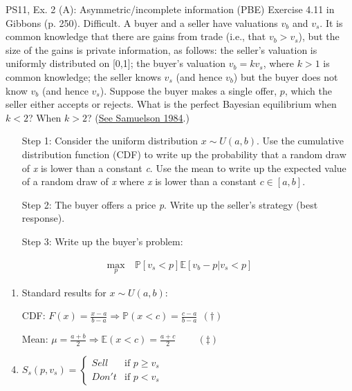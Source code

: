 \begin{frame}{PS11, Ex. 2 (A): Asymmetric/incomplete information (PBE)}
    Exercise 4.11 in Gibbons (p. 250). Difficult. A buyer and a seller have valuations $v_b$ and $v_s$. It is common knowledge that there are gains from trade (i.e., that $v_b > v_s$), but the size of the gains is private information, as follows: the seller’s valuation is uniformly distributed on [0,1]; the buyer’s valuation $v_b = kv_s$, where $k > 1$ is common knowledge; the seller knows $v_s$ (and hence $v_b$) but the buyer does not know $v_b$ (and hence $v_s$). Suppose the buyer makes a single offer, $p$, which the seller either accepts or rejects. What is the perfect Bayesian equilibrium when $k < 2$? When $k > 2$? (\href{https://www.jstor.org/stable/1911195}{See Samuelson 1984}.) \vspace{-8pt}
    \begin{multicols}{2}
      \begin{itemize}
        \item[Step 1:] Consider the uniform distribution $x\sim U(a, b)$. Use the cumulative distribution function (CDF) to write up the probability that a random draw of \textit{x} is lower than a constant \textit{c}. Use the mean to write up the expected value of a random draw of \textit{x} where \textit{x} is lower than a constant $c\in[a,b]$.
        \item[Step 2:] The buyer offers a price \textit{p}. Write up the seller's strategy (best response).
        \item[Step 3:] Write up the buyer's problem:
      \end{itemize} \vspace{-8pt}
      \begin{align*}
        \displaystyle{\max_p}&\ \mathbb{P}[v_s<p]\mathbb{E}[v_b-p|v_s<p]
      \end{align*}
      \vfill\null\columnbreak
      \begin{enumerate}
        \item Standard results for $x\sim U(a, b):$
        \item[CDF:] $F(x)=\frac{x-a}{b-a}\Rightarrow\mathbb{P}(x<c)=\frac{c-a}{b-a}\ \ (\dagger)$
        \item[Mean:] $\mu=\frac{a+b}{2}\Rightarrow\mathbb{E}(x<c)=\frac{a+c}{2}\quad\quad\ (\ddagger)$
        \item $S_s(p,v_s)=\left\{\begin{array}{ll}
          Sell  & \text{if }p\geq v_s \\
          Don't & \text{if }p < v_s
        \end{array}\right.$
      \end{enumerate}
      \vfill\null
    \end{multicols}
\end{frame}
